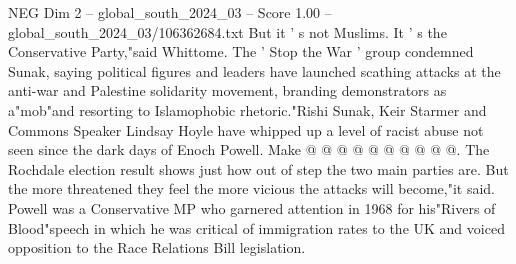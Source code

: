 \begin{textsample}{NEG Dim 2 – global\_south\_2024\_03 – Score 1.00 – global\_south\_2024\_03/106362684.txt}
But it ' s not Muslims.
It ' s the Conservative Party,"said Whittome.
The ' Stop the War ' group condemned Sunak, saying political figures and leaders have launched scathing attacks at the anti-war and Palestine solidarity movement, branding demonstrators as a"mob"and resorting to Islamophobic rhetoric."Rishi Sunak, Keir Starmer and Commons Speaker Lindsay Hoyle have whipped up a level of racist abuse not seen since the dark days of Enoch Powell.
Make @ @ @ @ @ @ @ @ @ @.
The Rochdale election result shows just how out of step the two main parties are.
But the more threatened they feel the more vicious the attacks will become,"it said.
Powell was a Conservative MP who garnered attention in 1968 for his"Rivers of Blood"speech in which he was critical of immigration rates to the UK and voiced opposition to the Race Relations Bill legislation.

\end{textsample}
